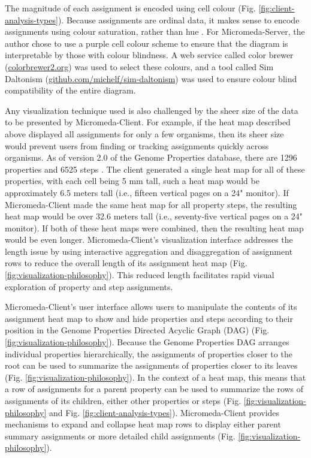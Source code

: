 The magnitude of each assignment is encoded using cell colour (Fig. \ref{fig:client-analysis-types}). Because assignments are ordinal data, it makes sense to encode assignments using colour saturation, rather than hue \cite{munzner2015visualization}. For Micromeda-Server, the author chose to use a purple cell colour scheme to ensure that the diagram is interpretable by those with colour blindness. A web service called color brewer (\href{colorbrewer2.org}{colorbrewer2.org}) was used to select these colours, and a tool called Sim Daltonism (\href{github.com/michelf/sim-daltonism}{github.com/michelf/sim-daltonism}) was used to ensure colour blind compatibility of the entire diagram.

Any visualization technique used is also challenged by the sheer size of the data to be presented by Micromeda-Client. For example, if the heat map described above displayed all assignments for only a few organisms, then its sheer size would prevent users from finding or tracking assignments quickly across organisms. As of version 2.0 of the Genome Properties database, there are 1296 properties and 6525 steps \cite{richardson2018genome}. The client generated a single heat map for all of these properties, with each cell being 5 mm tall, such a heat map would be approximately 6.5 meters tall (i.e., fifteen vertical pages on a 24" monitor). If Micromeda-Client made the same heat map for all property steps, the resulting heat map would be over 32.6 meters tall (i.e., seventy-five vertical pages on a 24" monitor). If both of these heat maps were combined, then the resulting heat map would be even longer. Micromeda-Client's visualization interface addresses the length issue by using interactive aggregation and disaggregation \cite{munzner2015visualization} of assignment rows to reduce the overall length of its assignment heat map (Fig. \ref{fig:visualization-philosophy}). This reduced length facilitates rapid visual exploration of property and step assignments.

Micromeda-Client's user interface allows users to manipulate the contents of its assignment heat map to show and hide properties and steps according to their position in the Genome Properties Directed Acyclic Graph (DAG) \cite{richardson2018genome} (Fig. \ref{fig:visualization-philosophy}). Because the Genome Properties DAG arranges individual properties hierarchically, the assignments of properties closer to the root can be used to summarize the assignments of properties closer to its leaves (Fig. \ref{fig:visualization-philosophy}). In the context of a heat map, this means that a row of assignments for a parent property can be used to summarize the rows of assignments of its children, either other properties or steps (Fig. \ref{fig:visualization-philosophy} and Fig. \ref{fig:client-analysis-types}). Micromeda-Client provides mechanisms to expand and collapse heat map rows to display either parent summary assignments or more detailed child assignments (Fig. \ref{fig:visualization-philosophy}).

